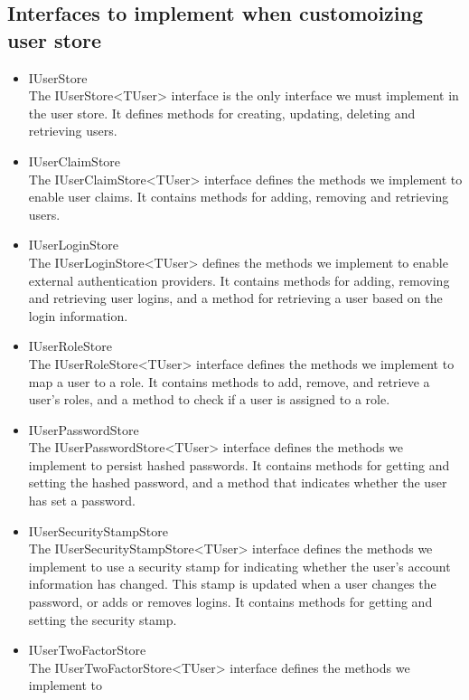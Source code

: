 \documentclass{report}
\begin{document}
    \subsection{Interfaces to implement when customoizing user store}
    \begin{itemize}
        \item IUserStore\\
        The IUserStore<TUser> interface is the only interface we must implement in the user store.
        It defines methods for creating, updating, deleting and retrieving users.
        \item IUserClaimStore\\
        The IUserClaimStore<TUser> interface defines the methods we implement to enable user claims.
        It contains methods for adding, removing and retrieving users.
        \item IUserLoginStore\\
        The IUserLoginStore<TUser> defines the methods we implement to enable external
        authentication providers. It contains methods for adding, removing and retrieving
        user logins, and a method for retrieving a user based on the login information.
        \item IUserRoleStore\\
        The IUserRoleStore<TUser> interface defines the methods we implement to map a user to
        a role. It contains methods to add, remove, and retrieve a user's roles, and a method to
        check if a user is assigned to a role.
        \item IUserPasswordStore\\
        The IUserPasswordStore<TUser> interface defines the methods we implement to persist
        hashed passwords. It contains methods for getting and setting the hashed password, and
        a method that indicates whether the user has set a password.
        \item IUserSecurityStampStore\\
        The IUserSecurityStampStore<TUser> interface defines the methods we implement
        to use a security stamp for indicating whether the user's account information
        has changed. This stamp is updated when a user changes the password, or adds
        or removes logins. It contains methods for getting and setting the security
        stamp.
        \item IUserTwoFactorStore\\
        The IUserTwoFactorStore<TUser> interface defines the methods we implement to

\end{itemize}
\end{document}
